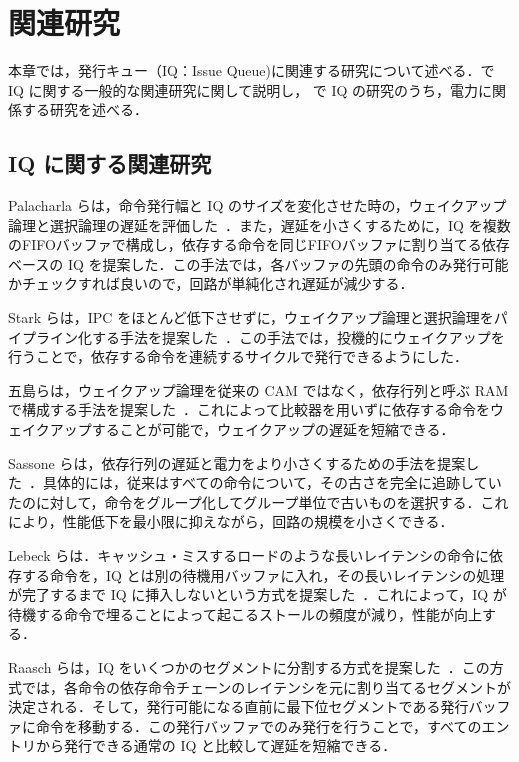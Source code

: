 
\chapter{関連研究}
\label{sec:related_work}
本章では，発行キュー（IQ：Issue Queue)に関連する研究について述べる．で IQ に関する一般的な関連研究に関して説明し， で IQ の研究のうち，電力に関係する研究を述べる．

\section{IQ に関する関連研究}
\label{sec:relate_IQ}
Palacharla らは，命令発行幅と IQ のサイズを変化させた時の，ウェイクアップ論理と選択論理の遅延を評価した~\cite{Palacharla1997}．また，遅延を小さくするために，IQ を複数のFIFOバッファで構成し，依存する命令を同じFIFOバッファに割り当てる依存ベースの IQ を提案した．この手法では，各バッファの先頭の命令のみ発行可能かチェックすれば良いので，回路が単純化され遅延が減少する．

Stark らは，IPC をほとんど低下させずに，ウェイクアップ論理と選択論理をパイプライン化する手法を提案した~\cite{Stark2000}．この手法では，投機的にウェイクアップを行うことで，依存する命令を連続するサイクルで発行できるようにした．

五島らは，ウェイクアップ論理を従来の CAM ではなく，依存行列と呼ぶ RAM で構成する手法を提案した~\cite{goshima2001}．これによって比較器を用いずに依存する命令をウェイクアップすることが可能で，ウェイクアップの遅延を短縮できる．

Sassone らは，依存行列の遅延と電力をより小さくするための手法を提案した~\cite{sassone2007}．具体的には，従来はすべての命令について，その古さを完全に追跡していたのに対して，命令をグループ化してグループ単位で古いものを選択する．これにより，性能低下を最小限に抑えながら，回路の規模を小さくできる．

Lebeck らは．キャッシュ・ミスするロードのような長いレイテンシの命令に依存する命令を，IQ とは別の待機用バッファに入れ，その長いレイテンシの処理が完了するまで IQ に挿入しないという方式を提案した~\cite{Lebeck2002}．これによって，IQ が待機する命令で埋ることによって起こるストールの頻度が減り，性能が向上する．

Raasch らは，IQ をいくつかのセグメントに分割する方式を提案した~\cite{Raasch2002}．この方式では，各命令の依存命令チェーンのレイテンシを元に割り当てるセグメントが決定される．そして，発行可能になる直前に最下位セグメントである発行バッファに命令を移動する．この発行バッファでのみ発行を行うことで，すべてのエントリから発行できる通常の IQ と比較して遅延を短縮できる．

